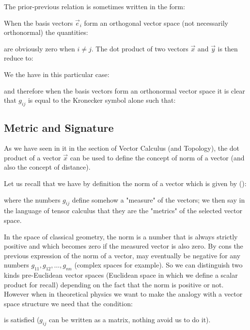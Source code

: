 	The prior-previous relation is sometimes written in the form:
	
	\begin{tcolorbox}[title=Remark,colframe=black,arc=10pt]
	When the basis vectors $\vec{e}_i$ form an orthogonal vector space (not necessarily orthonormal) the quantities:
	
	are obviously zero when $i \neq j$. The dot product of two vectors $\vec{x}$ and $\vec{y}$ is then reduce to:
	
	We the have in this particular case\label{condensed flat metric space notation}:
	
	and therefore when the basis vectors form an orthonormal vector space it is clear that $g_{ij}$ is equal to the Kronecker symbol alone such that:
	
	\end{tcolorbox}
	
	\subsection{Metric and Signature}\label{metric and signature}
	As we have seen in it in the section of Vector Calculus (and Topology), the dot product of a vector $\vec{x}$ can be used to define the concept of norm of a vector (and also the concept of distance).
	
	Let us recall that we have by definition the norm of a vector which is given by ()\label{norm tensor notation}:
	
	where the numbers $g_{ij}$ define somehow a "measure" of the vectors; we then say in the language of tensor calculus that they are the "metrics" of the selected vector space.
	
	In the space of classical geometry, the norm is a number that is always strictly positive and which becomes zero if the measured vector is also zero. By cons the previous expression of the norm of a vector, may eventually be negative for any numbers $g_{11},g_{12},\ldots,g_{nn}$ (complex spaces for example). So we can distinguish two kinds pre-Euclidean vector spaces\label{pre euclidean vector space} (Euclidean space in which we define a scalar product for recall) depending on the fact that the norm is positive or not. However when in theoretical physics we want to make the analogy with a vector space structure we need that the condition:
	
	is satisfied ($g_{ij}$ can be written as a matrix, nothing avoid us to do it).
	
